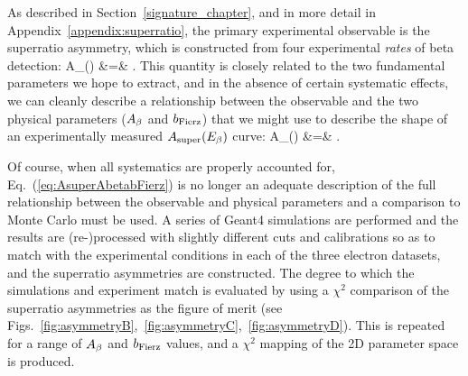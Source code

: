 As described in Section~\ref{signature_chapter}, and in more detail in Appendix~\ref{appendix:superratio}, the primary experimental observable is the superratio asymmetry, which is constructed from four experimental \emph{rates} of beta detection:
\bea
A_{}(\Ebeta) 
&=& 
.
\eea
This quantity is closely related to the two fundamental parameters we hope to extract, 
and in the absence of certain systematic effects, we can cleanly describe a relationship between the observable
and the two physical parameters ($A_{\beta}$ and $b_{\mathrm{Fierz}}$) that we might use to describe the shape of an experimentally measured $A_{\mathrm{super}}(E_{\beta})$ curve:
\bea
A_{}(\Ebeta) 
&=&
.
\label{eq:AsuperAbetabFierz}
\eea

Of course, when all systematics are properly accounted for, Eq.~(\ref{eq:AsuperAbetabFierz}) is no longer an adequate description of the full relationship between the observable and physical parameters and a comparison to Monte Carlo must be used.  A series of Geant4 simulations are performed and the results are (re-)processed with slightly different cuts and calibrations so as to match with the experimental conditions in each of the three electron datasets, and the superratio asymmetries are constructed.  The degree to which the simulations and experiment match is evaluated by using a $\chi^2$ comparison of the superratio asymmetries as the figure of merit (see Figs.~\ref{fig:asymmetryB},~\ref{fig:asymmetryC},~\ref{fig:asymmetryD}).  This is repeated for a range of $A_{\beta}$ and $b_{\mathrm{Fierz}}$ values, and a $\chi^2$ mapping of the 2D parameter space is produced.  


